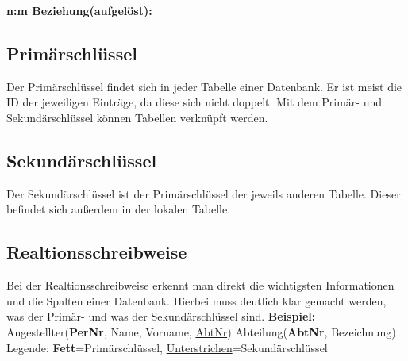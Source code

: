 \documentclass[12pt,a4paper]{article}
\begin{document}
    \textbf{n:m Beziehung(aufgelöst):}
    \begin{center}
    \end{center}

\subsection{Primärschlüssel}
    Der Primärschlüssel findet sich in jeder Tabelle einer Datenbank. Er ist meist die ID der jeweiligen Einträge, da diese sich nicht doppelt. Mit dem Primär- und Sekundärschlüssel können Tabellen verknüpft werden.
    
\subsection{Sekundärschlüssel}
    Der Sekundärschlüssel ist der Primärschlüssel der jeweils anderen Tabelle. Dieser befindet sich außerdem in der lokalen Tabelle.

\subsection{Realtionsschreibweise}
    Bei der Realtionsschreibweise erkennt man direkt die wichtigsten Informationen und die Spalten einer Datenbank. Hierbei muss deutlich klar gemacht werden, was der Primär- und was der Sekundärschlüssel sind.\newline
    \textbf{Beispiel:}\newline
    Angestellter(\textbf{PerNr}, Name, Vorname, \underline{AbtNr})\newline
    Abteilung(\textbf{AbtNr}, Bezeichnung)\newline
    \vspace{0.2cm}\newline
    Legende:\newline
    \textbf{Fett}=Primärschlüssel, \underline{Unterstrichen}=Sekundärschlüssel
    
\end{document}
